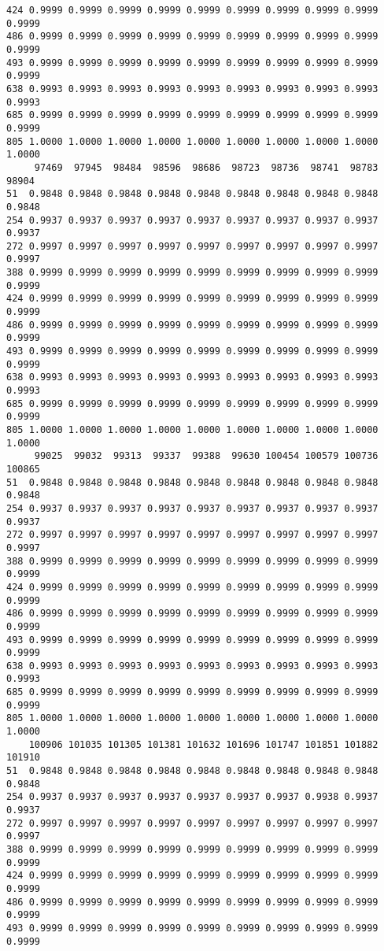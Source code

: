 \documentclass[
]{report}
\begin{document}
\begin{verbatim}
424 0.9999 0.9999 0.9999 0.9999 0.9999 0.9999 0.9999 0.9999 0.9999 0.9999
486 0.9999 0.9999 0.9999 0.9999 0.9999 0.9999 0.9999 0.9999 0.9999 0.9999
493 0.9999 0.9999 0.9999 0.9999 0.9999 0.9999 0.9999 0.9999 0.9999 0.9999
638 0.9993 0.9993 0.9993 0.9993 0.9993 0.9993 0.9993 0.9993 0.9993 0.9993
685 0.9999 0.9999 0.9999 0.9999 0.9999 0.9999 0.9999 0.9999 0.9999 0.9999
805 1.0000 1.0000 1.0000 1.0000 1.0000 1.0000 1.0000 1.0000 1.0000 1.0000
     97469  97945  98484  98596  98686  98723  98736  98741  98783  98904
51  0.9848 0.9848 0.9848 0.9848 0.9848 0.9848 0.9848 0.9848 0.9848 0.9848
254 0.9937 0.9937 0.9937 0.9937 0.9937 0.9937 0.9937 0.9937 0.9937 0.9937
272 0.9997 0.9997 0.9997 0.9997 0.9997 0.9997 0.9997 0.9997 0.9997 0.9997
388 0.9999 0.9999 0.9999 0.9999 0.9999 0.9999 0.9999 0.9999 0.9999 0.9999
424 0.9999 0.9999 0.9999 0.9999 0.9999 0.9999 0.9999 0.9999 0.9999 0.9999
486 0.9999 0.9999 0.9999 0.9999 0.9999 0.9999 0.9999 0.9999 0.9999 0.9999
493 0.9999 0.9999 0.9999 0.9999 0.9999 0.9999 0.9999 0.9999 0.9999 0.9999
638 0.9993 0.9993 0.9993 0.9993 0.9993 0.9993 0.9993 0.9993 0.9993 0.9993
685 0.9999 0.9999 0.9999 0.9999 0.9999 0.9999 0.9999 0.9999 0.9999 0.9999
805 1.0000 1.0000 1.0000 1.0000 1.0000 1.0000 1.0000 1.0000 1.0000 1.0000
     99025  99032  99313  99337  99388  99630 100454 100579 100736 100865
51  0.9848 0.9848 0.9848 0.9848 0.9848 0.9848 0.9848 0.9848 0.9848 0.9848
254 0.9937 0.9937 0.9937 0.9937 0.9937 0.9937 0.9937 0.9937 0.9937 0.9937
272 0.9997 0.9997 0.9997 0.9997 0.9997 0.9997 0.9997 0.9997 0.9997 0.9997
388 0.9999 0.9999 0.9999 0.9999 0.9999 0.9999 0.9999 0.9999 0.9999 0.9999
424 0.9999 0.9999 0.9999 0.9999 0.9999 0.9999 0.9999 0.9999 0.9999 0.9999
486 0.9999 0.9999 0.9999 0.9999 0.9999 0.9999 0.9999 0.9999 0.9999 0.9999
493 0.9999 0.9999 0.9999 0.9999 0.9999 0.9999 0.9999 0.9999 0.9999 0.9999
638 0.9993 0.9993 0.9993 0.9993 0.9993 0.9993 0.9993 0.9993 0.9993 0.9993
685 0.9999 0.9999 0.9999 0.9999 0.9999 0.9999 0.9999 0.9999 0.9999 0.9999
805 1.0000 1.0000 1.0000 1.0000 1.0000 1.0000 1.0000 1.0000 1.0000 1.0000
    100906 101035 101305 101381 101632 101696 101747 101851 101882 101910
51  0.9848 0.9848 0.9848 0.9848 0.9848 0.9848 0.9848 0.9848 0.9848 0.9848
254 0.9937 0.9937 0.9937 0.9937 0.9937 0.9937 0.9937 0.9938 0.9937 0.9937
272 0.9997 0.9997 0.9997 0.9997 0.9997 0.9997 0.9997 0.9997 0.9997 0.9997
388 0.9999 0.9999 0.9999 0.9999 0.9999 0.9999 0.9999 0.9999 0.9999 0.9999
424 0.9999 0.9999 0.9999 0.9999 0.9999 0.9999 0.9999 0.9999 0.9999 0.9999
486 0.9999 0.9999 0.9999 0.9999 0.9999 0.9999 0.9999 0.9999 0.9999 0.9999
493 0.9999 0.9999 0.9999 0.9999 0.9999 0.9999 0.9999 0.9999 0.9999 0.9999

\end{verbatim}
\end{document}
